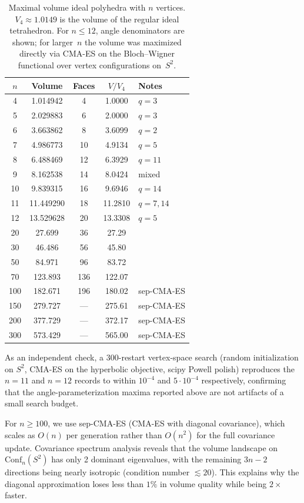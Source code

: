 \documentclass[11pt]{article}
\begin{document}
\begin{table}[htbp]
\centering
\caption{Maximal volume ideal polyhedra with $n$ vertices.
$V_4 \approx 1.0149$ is the volume of the regular ideal tetrahedron.
For $n \leq 12$, angle denominators are shown; for larger~$n$ the
volume was maximized directly via CMA-ES on the Bloch--Wigner
functional over vertex configurations on~$S^2$.}
\label{tab:maximal-volumes}
\begin{tabular}{ccccl}
\toprule
$n$ & Volume & Faces & $V/V_4$ & Notes \\
\midrule
4 & 1.014942 & 4 & 1.0000 & $q = 3$ \\
5 & 2.029883 & 6 & 2.0000 & $q = 3$ \\
6 & 3.663862 & 8 & 3.6099 & $q = 2$ \\
7 & 4.986773 & 10 & 4.9134 & $q = 5$ \\
8 & 6.488469 & 12 & 6.3929 & $q = 11$ \\
9 & 8.162538 & 14 & 8.0424 & mixed \\
10 & 9.839315 & 16 & 9.6946 & $q = 14$ \\
11 & 11.449290 & 18 & 11.2810 & $q = 7, 14$ \\
12 & 13.529628 & 20 & 13.3308 & $q = 5$ \\
\midrule
20 & 27.699 & 36 & 27.29 & \\
30 & 46.486 & 56 & 45.80 & \\
50 & 84.971 & 96 & 83.72 & \\
70 & 123.893 & 136 & 122.07 & \\
100 & 182.671 & 196 & 180.02 & sep-CMA-ES \\
150 & 279.727 & --- & 275.61 & sep-CMA-ES \\
200 & 377.729 & --- & 372.17 & sep-CMA-ES \\
300 & 573.429 & --- & 565.00 & sep-CMA-ES \\
\bottomrule
\end{tabular}
\end{table}

As an independent check, a $300$-restart vertex-space search
(random initialization on $S^2$, CMA-ES on the hyperbolic objective,
scipy Powell polish) reproduces the $n = 11$ and $n = 12$ records
to within $10^{-4}$ and $5 \cdot 10^{-4}$ respectively, confirming
that the angle-parameterization maxima reported above are not
artifacts of a small search budget.

For $n \geq 100$, we use sep-CMA-ES (CMA-ES with diagonal
covariance), which scales as $O(n)$ per generation rather than
$O(n^2)$ for the full covariance update.  Covariance spectrum
analysis reveals that the volume landscape on $\mathrm{Conf}_n(S^2)$
has only 2 dominant eigenvalues, with the remaining $3n - 2$
directions being nearly isotropic (condition number $\lesssim 20$).
This explains why the diagonal approximation loses less than $1\%$
in volume quality while being $2\times$ faster.
\end{document}
